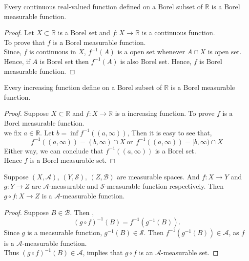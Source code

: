 \begin{theorem}
    Every continuous real-valued function defined on a Borel subset of $\mathds{R}$ is a Borel measurable function.
\end{theorem}
\begin{proof}
    Let $X\subset\mathds{R}$ is a Borel set and $f:X\to\mathds{R}$ is a continuous function.\\
    To prove that $f$ is a Borel measurable function.\\
    Since,  $f$ is continuous in  $X$,  $f^{-1}(A)$ is a open set whenever $A\cap X$ is open set. 
    Hence, if $A$ is Borel set then  $f^{-1}(A)$ is also Borel set.
    Hence, $f$ is Borel measurable function.
\end{proof}
\begin{theorem}
    Every increasing function define on a Borel subset of $\mathds{R}$ is a Borel measurable function.
\end{theorem}
\begin{proof}
    Suppose $X\subset\mathds{R}$ and $f:X\to\mathds{R}$ is a increasing function. To prove $f$ is a Borel measurable function.\\
    we fix $a\in\mathds{R}$. Let $b=\inf f^{-1}((a,\infty))$, Then it is easy to see that,
    \[
        f^{-1}((a,\infty))=(b,\infty)\cap X\ \text{or}\ \ f^{-1}((a,\infty))=[b,\infty)\cap X
    \]
    Either way, we can conclude that $f^{-1}((a,\infty))$ is a Borel set.\\
    Hence $f$ is a Borel measurable set.
\end{proof}
\begin{theorem}
    Suppose $(X,\mathcal{A}),\ (Y,\mathcal{S}),\ (Z,\mathcal{B})$ are measurable spaces.
    And $f:X\to Y$ and  $g:Y\to Z$ are  $\mathcal{A}$-measurable and $\mathcal{S}$-measurable function respectively.
    Then $g\circ f:X\to Z$ is a $\mathcal{A}$-measurable function.
\end{theorem}
\begin{proof}
    Suppose $B\in \mathcal{B}$. Then ,
    \[
        (g\circ f)^{-1}(B)=f^{-1}(g^{-1}(B)).
    \]
    Since $g$ is a measurable function,  $g^{-1}(B)\in \mathcal{S}$. Then $f^{-1}(g^{-1}(B))\in\mathcal{A}$, as $f$ is a  $\mathcal{A}$-measurable function.\\
    Thus $(g\circ f)^{-1}(B)\in \mathcal{A}$, implies that $g\circ f$ is an  $\mathcal{A}$-measurable set.
\end{proof}

